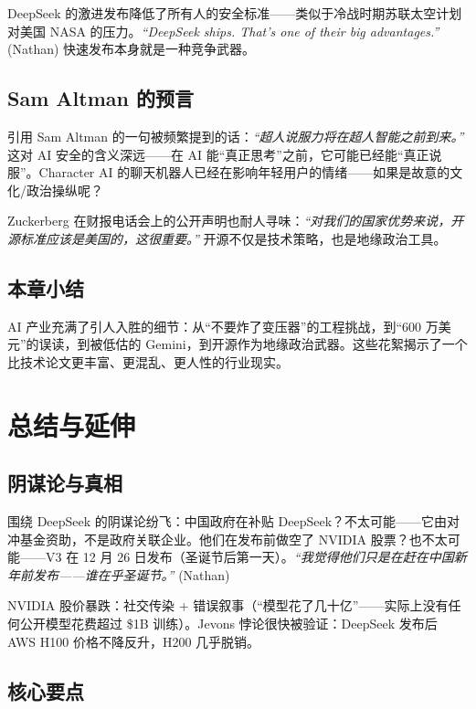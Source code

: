\documentclass[a4paper]{article}
\begin{document}
DeepSeek 的激进发布降低了所有人的安全标准——类似于冷战时期苏联太空计划对美国 NASA 的压力。\textit{``DeepSeek ships. That's one of their big advantages.''} (Nathan) 快速发布本身就是一种竞争武器。

\subsection{Sam Altman 的预言}

引用 Sam Altman 的一句被频繁提到的话：\textit{``超人说服力将在超人智能之前到来。''} 这对 AI 安全的含义深远——在 AI 能``真正思考''之前，它可能已经能``真正说服''。Character AI 的聊天机器人已经在影响年轻用户的情绪——如果是故意的文化/政治操纵呢？

Zuckerberg 在财报电话会上的公开声明也耐人寻味：\textit{``对我们的国家优势来说，开源标准应该是美国的，这很重要。''} 开源不仅是技术策略，也是地缘政治工具。

\subsection{本章小结}

AI 产业充满了引人入胜的细节：从``不要炸了变压器''的工程挑战，到``600 万美元''的误读，到被低估的 Gemini，到开源作为地缘政治武器。这些花絮揭示了一个比技术论文更丰富、更混乱、更人性的行业现实。

\section{总结与延伸}

\subsection{阴谋论与真相}

围绕 DeepSeek 的阴谋论纷飞：中国政府在补贴 DeepSeek？不太可能——它由对冲基金资助，不是政府关联企业。他们在发布前做空了 NVIDIA 股票？也不太可能——V3 在 12 月 26 日发布（圣诞节后第一天）。\textit{``我觉得他们只是在赶在中国新年前发布——谁在乎圣诞节。''} (Nathan)

NVIDIA 股价暴跌：社交传染 + 错误叙事（``模型花了几十亿''——实际上没有任何公开模型花费超过 \$1B 训练）。Jevons 悖论很快被验证：DeepSeek 发布后 AWS H100 价格不降反升，H200 几乎脱销。

\subsection{核心要点}
\end{document}
